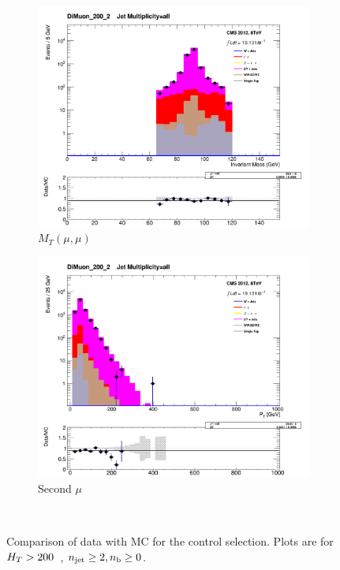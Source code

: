 \begin{figure}[!b]
  \centering
    \begin{subfigure}[b]{0.48\textwidth}
      \includegraphics[width=\textwidth]{Figs/datamc/mumu/Stacked_DiMuon_Mass_all_DiMuon_200_upwards}
      \caption{$M_T(\mu, \mu)$}
    \end{subfigure}
    \begin{subfigure}[b]{0.48\textwidth}
      \includegraphics[width=\textwidth]{Figs/datamc/mumu/Stacked_SecondMuPt_all_DiMuon_200_upwards}
      \caption{Second $\mu$ \Pt}
    \end{subfigure} \\
    \caption{\label{fig:datamc_mumu_inc}
    Comparison of data with MC for the \mmj control selection. Plots 
    are for $H_T>200$~\gev, $n_{\text{jet}}\geq2, n_{\text{b}}\geq0$.}
\end{figure}

